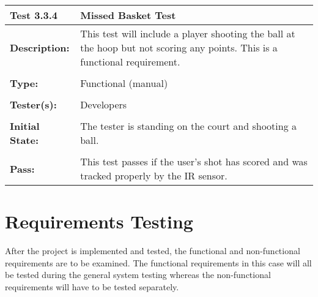 \documentclass{article}
\begin{document}
\begin{tabularx}{\textwidth}{p{2cm}p{9cm}}
\toprule 
{\bf Test 3.3.4 } & {\bf Missed Basket Test}\\
\midrule
\textbf{Description:} & This test will include a player shooting the ball at the hoop but not scoring any points.  This is a functional requirement. \\[0.3\baselineskip]
                      &                     \\
\textbf{Type:} & Functional (manual)   \\[0.3\baselineskip]
                      &                     \\
\textbf{Tester(s):} & Developers \\[0.3\baselineskip]
                      &                     \\
\textbf{Initial State:} & The tester is standing on the court and shooting a ball. \\[0.3\baselineskip]
                      &                     \\
\textbf{Pass:} & This test passes if the user's shot has scored and was tracked properly by the IR sensor.  \\[0.3\baselineskip]
\bottomrule
\end{tabularx}


\newpage
\section{Requirements Testing}
After the project is implemented and tested, the functional and non-functional requirements are to be examined. The functional requirements in this case will all be tested during the general system testing whereas the non-functional requirements will have to be tested separately.
\end{document}
